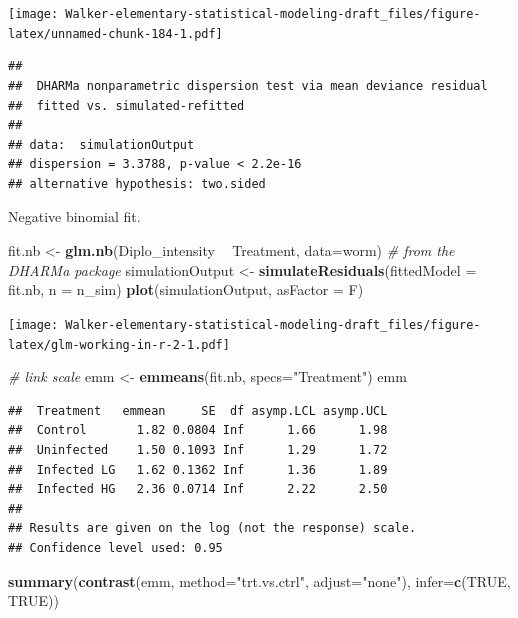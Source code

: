 \documentclass[]{book}
\newenvironment{Shaded}{\begin{snugshade}}{\end{snugshade}}
\newcommand{\CommentTok}[1]{\textcolor[rgb]{0.56,0.35,0.01}{\textit{#1}}}
\newcommand{\DataTypeTok}[1]{\textcolor[rgb]{0.13,0.29,0.53}{#1}}
\newcommand{\KeywordTok}[1]{\textcolor[rgb]{0.13,0.29,0.53}{\textbf{#1}}}
\newcommand{\NormalTok}[1]{#1}
\newcommand{\OperatorTok}[1]{\textcolor[rgb]{0.81,0.36,0.00}{\textbf{#1}}}
\newcommand{\OtherTok}[1]{\textcolor[rgb]{0.56,0.35,0.01}{#1}}
\newcommand{\StringTok}[1]{\textcolor[rgb]{0.31,0.60,0.02}{#1}}
\begin{document}
\texttt{[image: Walker-elementary-statistical-modeling-draft\_files/figure-latex/unnamed-chunk-184-1.pdf]}

\begin{verbatim}
## 
##  DHARMa nonparametric dispersion test via mean deviance residual
##  fitted vs. simulated-refitted
## 
## data:  simulationOutput
## dispersion = 3.3788, p-value < 2.2e-16
## alternative hypothesis: two.sided
\end{verbatim}

Negative binomial fit.

\begin{Shaded}
\begin{Highlighting}[]
\NormalTok{fit.nb <-}\StringTok{ }\KeywordTok{glm.nb}\NormalTok{(Diplo_intensity }\OperatorTok{~}\StringTok{ }\NormalTok{Treatment, }\DataTypeTok{data=}\NormalTok{worm)}
\CommentTok{# from the DHARMa package}
\NormalTok{  simulationOutput <-}\StringTok{ }\KeywordTok{simulateResiduals}\NormalTok{(}\DataTypeTok{fittedModel =}\NormalTok{ fit.nb, }\DataTypeTok{n =}\NormalTok{ n_sim)}
  \KeywordTok{plot}\NormalTok{(simulationOutput, }\DataTypeTok{asFactor =}\NormalTok{ F)}
\end{Highlighting}
\end{Shaded}

\texttt{[image: Walker-elementary-statistical-modeling-draft\_files/figure-latex/glm-working-in-r-2-1.pdf]}

\begin{Shaded}
\begin{Highlighting}[]
\CommentTok{# link scale}
\NormalTok{emm <-}\StringTok{ }\KeywordTok{emmeans}\NormalTok{(fit.nb, }\DataTypeTok{specs=}\StringTok{"Treatment"}\NormalTok{)}
\NormalTok{emm}
\end{Highlighting}
\end{Shaded}

\begin{verbatim}
##  Treatment   emmean     SE  df asymp.LCL asymp.UCL
##  Control       1.82 0.0804 Inf      1.66      1.98
##  Uninfected    1.50 0.1093 Inf      1.29      1.72
##  Infected LG   1.62 0.1362 Inf      1.36      1.89
##  Infected HG   2.36 0.0714 Inf      2.22      2.50
## 
## Results are given on the log (not the response) scale. 
## Confidence level used: 0.95
\end{verbatim}

\begin{Shaded}
\begin{Highlighting}[]
\KeywordTok{summary}\NormalTok{(}\KeywordTok{contrast}\NormalTok{(emm, }\DataTypeTok{method=}\StringTok{"trt.vs.ctrl"}\NormalTok{, }\DataTypeTok{adjust=}\StringTok{"none"}\NormalTok{), }\DataTypeTok{infer=}\KeywordTok{c}\NormalTok{(}\OtherTok{TRUE}\NormalTok{, }\OtherTok{TRUE}\NormalTok{))}
\end{Highlighting}
\end{Shaded}
\end{document}
